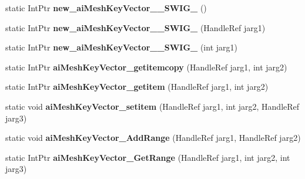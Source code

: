 \begin{DoxyCompactItemize}
\item 
\hypertarget{class_assimp_p_i_n_v_o_k_e_ac4c59731a9ee92f8e9d8b9f1470028ed}{static Int\+Ptr {\bfseries new\+\_\+ai\+Mesh\+Key\+Vector\+\_\+\+\_\+\+S\+W\+I\+G\+\_} ()}\label{class_assimp_p_i_n_v_o_k_e_ac4c59731a9ee92f8e9d8b9f1470028ed}

\item 
\hypertarget{class_assimp_p_i_n_v_o_k_e_a00a5f28e2a8826e64888190605e29030}{static Int\+Ptr {\bfseries new\+\_\+ai\+Mesh\+Key\+Vector\+\_\+\+\_\+\+S\+W\+I\+G\+\_} (Handle\+Ref jarg1)}\label{class_assimp_p_i_n_v_o_k_e_a00a5f28e2a8826e64888190605e29030}

\item 
\hypertarget{class_assimp_p_i_n_v_o_k_e_a421d976ce22dbf77d388f146db639f8c}{static Int\+Ptr {\bfseries new\+\_\+ai\+Mesh\+Key\+Vector\+\_\+\+\_\+\+S\+W\+I\+G\+\_} (int jarg1)}\label{class_assimp_p_i_n_v_o_k_e_a421d976ce22dbf77d388f146db639f8c}

\item 
\hypertarget{class_assimp_p_i_n_v_o_k_e_aed88088d748ce59a00aa3f1b6218b70d}{static Int\+Ptr {\bfseries ai\+Mesh\+Key\+Vector\+\_\+getitemcopy} (Handle\+Ref jarg1, int jarg2)}\label{class_assimp_p_i_n_v_o_k_e_aed88088d748ce59a00aa3f1b6218b70d}

\item 
\hypertarget{class_assimp_p_i_n_v_o_k_e_a262e32e92a293e9e20e13ccc1795cde8}{static Int\+Ptr {\bfseries ai\+Mesh\+Key\+Vector\+\_\+getitem} (Handle\+Ref jarg1, int jarg2)}\label{class_assimp_p_i_n_v_o_k_e_a262e32e92a293e9e20e13ccc1795cde8}

\item 
\hypertarget{class_assimp_p_i_n_v_o_k_e_a9ed7a1f34976d119e13983c0a770364b}{static void {\bfseries ai\+Mesh\+Key\+Vector\+\_\+setitem} (Handle\+Ref jarg1, int jarg2, Handle\+Ref jarg3)}\label{class_assimp_p_i_n_v_o_k_e_a9ed7a1f34976d119e13983c0a770364b}

\item 
\hypertarget{class_assimp_p_i_n_v_o_k_e_aaaf528ca6fd69ef3b190bc4680a28fa1}{static void {\bfseries ai\+Mesh\+Key\+Vector\+\_\+\+Add\+Range} (Handle\+Ref jarg1, Handle\+Ref jarg2)}\label{class_assimp_p_i_n_v_o_k_e_aaaf528ca6fd69ef3b190bc4680a28fa1}

\item 
\hypertarget{class_assimp_p_i_n_v_o_k_e_a1781dc0ebe21326b9cc8b44a1eb123c1}{static Int\+Ptr {\bfseries ai\+Mesh\+Key\+Vector\+\_\+\+Get\+Range} (Handle\+Ref jarg1, int jarg2, int jarg3)}\label{class_assimp_p_i_n_v_o_k_e_a1781dc0ebe21326b9cc8b44a1eb123c1}


\end{DoxyCompactItemize}
